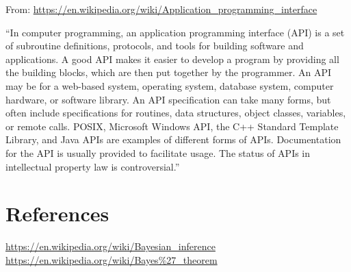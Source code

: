 \documentclass[11pt]{article}
\begin{document}
From: 
\href{https://en.wikipedia.org/wiki/Application\_programming\_interface}{https://en.wikipedia.org/wiki/Application\_programming\_interface}

\noindent
``In computer programming, an application programming interface (API) is a set of subroutine definitions, protocols, and tools for building software and applications. A good API makes it easier to develop a program by providing all the building blocks, which are then put together by the programmer. An API may be for a web-based system, operating system, database system, computer hardware, or software library. An API specification can take many forms, but often include specifications for routines, data structures, object classes, variables, or remote calls. POSIX, Microsoft Windows API, the C++ Standard Template Library, and Java APIs are examples of different forms of APIs. Documentation for the API is usually provided to facilitate usage. The status of APIs in intellectual property law is controversial.''















\section{References}
\href{https://en.wikipedia.org/wiki/Bayesian\_inference}{https://en.wikipedia.org/wiki/Bayesian\_inference}\\
\href{hrefhttps://en.wikipedia.org/wiki/Bayes\%27\_theorem}{https://en.wikipedia.org/wiki/Bayes\%27\_theorem}\\

\citet{Croom04}



\end{document}
